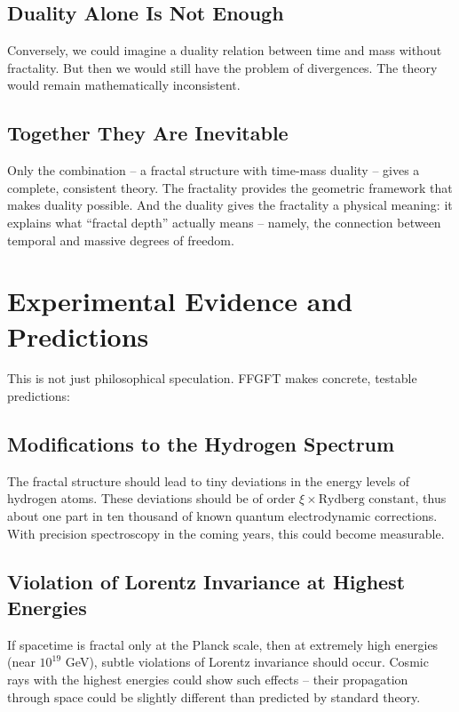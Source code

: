 \subsection{Duality Alone Is Not Enough}

Conversely, we could imagine a duality relation between time and mass without fractality. But then we would still have the problem of divergences. The theory would remain mathematically inconsistent.

\subsection{Together They Are Inevitable}

Only the combination -- a fractal structure with time-mass duality -- gives a complete, consistent theory. The fractality provides the geometric framework that makes duality possible. And the duality gives the fractality a physical meaning: it explains what ``fractal depth'' actually means -- namely, the connection between temporal and massive degrees of freedom.

\section{Experimental Evidence and Predictions}

This is not just philosophical speculation. FFGFT makes concrete, testable predictions:

\subsection{Modifications to the Hydrogen Spectrum}

The fractal structure should lead to tiny deviations in the energy levels of hydrogen atoms. These deviations should be of order $\xi \times \text{Rydberg constant}$, thus about one part in ten thousand of known quantum electrodynamic corrections. With precision spectroscopy in the coming years, this could become measurable.

\subsection{Violation of Lorentz Invariance at Highest Energies}

If spacetime is fractal only at the Planck scale, then at extremely high energies (near $10^{19}$ GeV), subtle violations of Lorentz invariance should occur. Cosmic rays with the highest energies could show such effects -- their propagation through space could be slightly different than predicted by standard theory.

